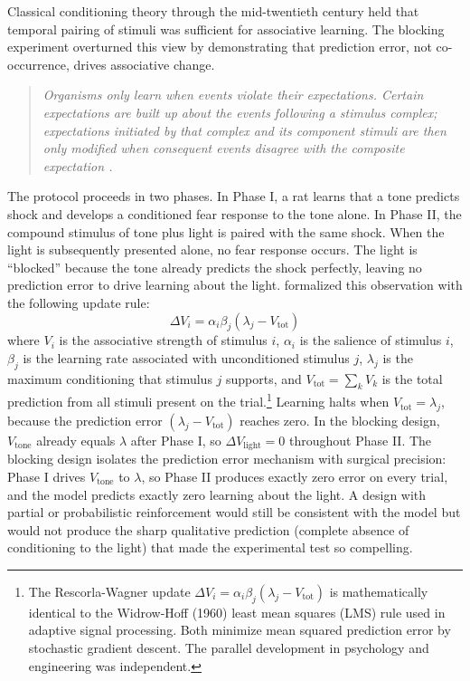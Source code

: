 Classical conditioning theory through the mid-twentieth century held that temporal pairing of stimuli was sufficient for associative learning. The blocking experiment overturned this view by demonstrating that prediction error, not co-occurrence, drives associative change.

\begin{quote}\itshape
Organisms only learn when events violate their expectations. Certain expectations are built up about the events following a stimulus complex; expectations initiated by that complex and its component stimuli are then only modified when consequent events disagree with the composite expectation \citep{RescorlaWagner1972}.
\end{quote}

The protocol proceeds in two phases. In Phase I, a rat learns that a tone predicts shock and develops a conditioned fear response to the tone alone. In Phase II, the compound stimulus of tone plus light is paired with the same shock. When the light is subsequently presented alone, no fear response occurs. The light is ``blocked'' because the tone already predicts the shock perfectly, leaving no prediction error to drive learning about the light. \citet{RescorlaWagner1972} formalized this observation with the following update rule:
\begin{equation}
\Delta V_i = \alpha_i \beta_j (\lambda_j - V_{\text{tot}})
\end{equation}
where $V_i$ is the associative strength of stimulus $i$, $\alpha_i$ is the salience of stimulus $i$, $\beta_j$ is the learning rate associated with unconditioned stimulus $j$, $\lambda_j$ is the maximum conditioning that stimulus $j$ supports, and $V_{\text{tot}} = \sum_k V_k$ is the total prediction from all stimuli present on the trial.\footnote{The Rescorla-Wagner update $\Delta V_i = \alpha_i \beta_j (\lambda_j - V_{\text{tot}})$ is mathematically identical to the Widrow-Hoff (1960) least mean squares (LMS) rule used in adaptive signal processing. Both minimize mean squared prediction error by stochastic gradient descent. The parallel development in psychology and engineering was independent.} Learning halts when $V_{\text{tot}} = \lambda_j$, because the prediction error $(\lambda_j - V_{\text{tot}})$ reaches zero. In the blocking design, $V_{\text{tone}}$ already equals $\lambda$ after Phase I, so $\Delta V_{\text{light}} = 0$ throughout Phase II. The blocking design isolates the prediction error mechanism with surgical precision: Phase I drives $V_{\text{tone}}$ to $\lambda$, so Phase II produces exactly zero error on every trial, and the model predicts exactly zero learning about the light. A design with partial or probabilistic reinforcement would still be consistent with the model but would not produce the sharp qualitative prediction (complete absence of conditioning to the light) that made the experimental test so compelling.

